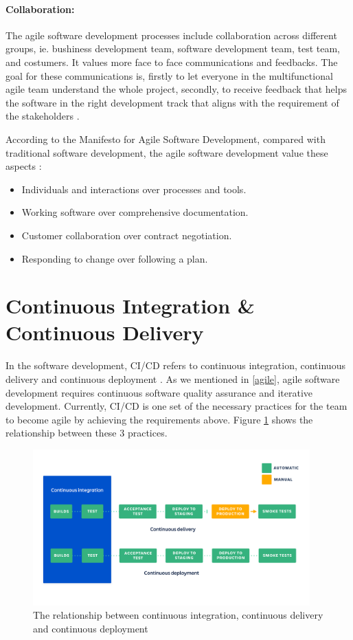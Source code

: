 \paragraph{Collaboration:}
The agile software development processes include collaboration across different groups, ie. bushiness development team, software development team, test team, and costumers. It values more face to face communications \cite{beck2001principles} and feedbacks. The goal for these communications is, firstly to let everyone in the multifunctional agile team understand the whole project, secondly, to receive feedback that helps the software in the right development track that aligns with the requirement of the stakeholders \cite{beck2001manifesto}. 
\par
According to the Manifesto for Agile Software Development, compared with traditional software development, the agile software development value these aspects \cite{beck2001manifesto}: 
\begin{itemize}
\item Individuals and interactions over processes and tools.
\item Working software over comprehensive documentation.
\item Customer collaboration over contract negotiation.
\item Responding to change over following a plan.
\end{itemize}
\section{Continuous Integration \& Continuous Delivery}
In the software development, CI/CD refers to continuous integration, continuous delivery and continuous deployment \cite{pittet2018continuous}. As we mentioned in \ref{agile}, agile software development requires continuous software quality assurance and iterative development. Currently, CI/CD is one set of the necessary practices for the team to become agile by achieving the requirements above. Figure \ref{fig:cicd} shows the relationship between these 3 practices.
\begin{figure}[h]
    \centering
    \includegraphics[width=0.95\textwidth]{pics/cicd.png}
    \caption{The relationship between continuous integration, continuous delivery and continuous deployment \cite{pittet2018continuous}}
    \label{fig:cicd}
\end{figure}
